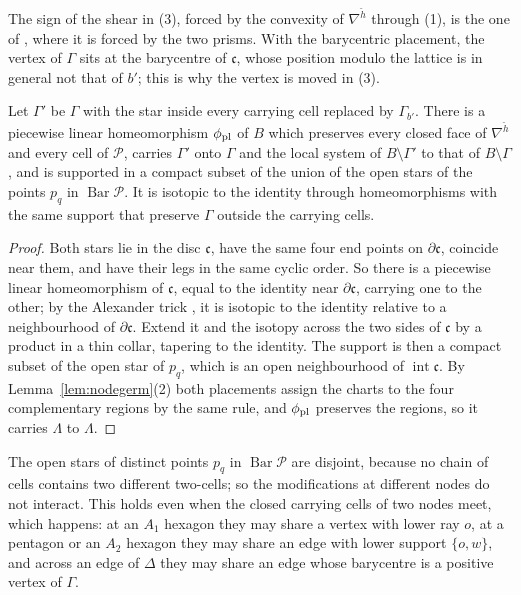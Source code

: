 The sign of the shear in (3), forced by the convexity of $\nabla^{\check h}$ through (1), is the one of \cite[Ex.~6.1]{CBM}, where it
is forced by the two prisms. With the barycentric placement, the vertex of $\Gamma$ sits at the barycentre of $\mathfrak c$, whose
position modulo the lattice is in general not that of $b'$; this is why the vertex is moved in (3).

\begin{lemma}[placement]\label{lem:placement}
Let $\Gamma'$ be $\Gamma$ with the star inside every carrying cell replaced by $\Gamma_{b'}$. There is a piecewise linear
homeomorphism $\phi_{\rm pl}$ of $B$ which preserves every closed face of $\nabla^{\check h}$ and every cell of $\mathscr P$, carries
$\Gamma'$ onto $\Gamma$ and the local system of $B\setminus\Gamma'$ to that of $B\setminus\Gamma$, and is supported in a compact
subset of the union of the open stars of the points $p_q$ in $\operatorname{Bar}\mathscr P$. It is isotopic to the identity
through homeomorphisms with the same support that preserve $\Gamma$ outside the carrying cells.
\end{lemma}

\begin{proof}
Both stars lie in the disc $\mathfrak c$, have the same four end points on $\partial\mathfrak c$, coincide near them, and have their
legs in the same cyclic order. So there is a piecewise linear homeomorphism of $\mathfrak c$, equal to the identity near
$\partial\mathfrak c$, carrying one to the other; by the Alexander trick \cite{Ale23}, \cite[Lemma~2.1]{FM12} it is isotopic to the
identity relative to a neighbourhood of $\partial\mathfrak c$. Extend it and the isotopy across the two sides of $\mathfrak c$ by a
product in a thin collar, tapering to the identity. The support is then a compact subset of the open star of $p_q$, which is an
open neighbourhood of $\operatorname{int}\mathfrak c$. By Lemma~\ref{lem:nodegerm}(2) both placements assign the charts to the four
complementary regions by the same rule, and $\phi_{\rm pl}$ preserves the regions, so it carries $\Lambda$ to $\Lambda$.
\end{proof}

The open stars of distinct points $p_q$ in $\operatorname{Bar}\mathscr P$ are disjoint, because no chain of cells contains two
different two-cells; so the modifications at different nodes do not interact. This holds even when the closed carrying cells of
two nodes meet, which happens: at an $A_1$ hexagon they may share a vertex with lower ray $o$, at a pentagon or an $A_2$ hexagon
they may share an edge with lower support $\{o,w\}$, and across an edge of $\Delta$ they may share an edge whose barycentre is a positive
vertex of $\Gamma$.

